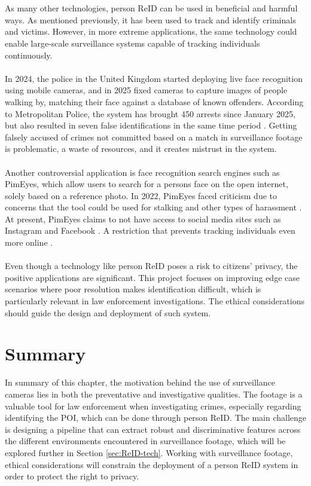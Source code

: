 \\\\
As many other technologies, person \ac{ReID} can be used in beneficial and harmful ways. As mentioned previously, it has been used to track and identify criminals and victims. However, in more extreme applications, the same technology could enable large-scale surveillance systems capable of tracking individuals continuously. 
\\\\
In 2024, the police in the United Kingdom started deploying live face recognition using mobile cameras, and in 2025 fixed cameras to capture images of people walking by, matching their face against a database of known offenders. According to Metropolitan Police, the system has brought 450 arrests since January 2025, but also resulted in seven false identifications in the same time period \cite{BBC-london-facerecognition}. Getting falsely accused of crimes not committed based on a match in surveillance footage is problematic, a waste of resources, and it creates mistrust in the system.
\\\\
Another controversial application is face recognition search engines such as PimEyes, which allow users to search for a persons face on the open internet, solely based on a reference photo. In 2022, PimEyes faced criticism due to concerns that the tool could be used for stalking and other types of harassment \cite{pimeyes-critic-bigbrother, pimeyes-critic-BBC}. At present, PimEyes claims to not have access to social media sites such as Instagram and Facebook \cite{pimeyes-homepage}. A restriction that prevents tracking individuals even more online \cite{pimeyes-critic-BBC}.
\\\\
Even though a technology like person \ac{ReID} poses a risk to citizens' privacy, the positive applications are significant. This project focuses on improving edge case scenarios where poor resolution makes identification difficult, which is particularly relevant in law enforcement investigations. The ethical considerations should guide the design and deployment of such system.

\section{Summary}
In summary of this chapter, the motivation behind the use of surveillance cameras lies in both the preventative and investigative qualities. The footage is a valuable tool for law enforcement when investigating crimes, especially regarding identifying the \ac{POI}, which can be done through person \ac{ReID}. The main challenge is designing a pipeline that can extract robust and discriminative features across the different environments encountered in surveillance footage, which will be explored further in Section \ref{sec:ReID-tech}. Working with surveillance footage, ethical considerations will constrain the deployment of a person \ac{ReID} system in order to protect the right to privacy.